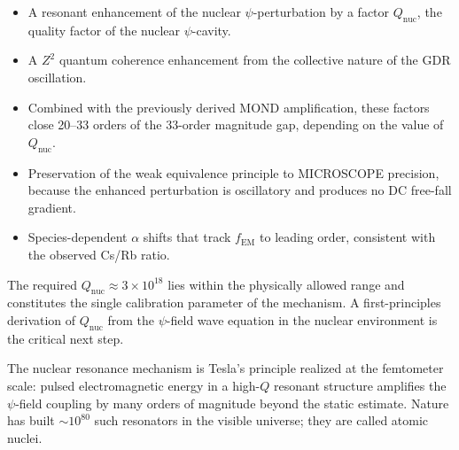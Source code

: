 \documentclass[aps,prd,twocolumn,superscriptaddress,nofootinbib]{revtex4-2}
\newcommand{\ee}[1]{\times 10^{#1}}
\newcommand{\fEM}{f_{\mathrm{EM}}}
\newcommand{\Qnuc}{Q_{\mathrm{nuc}}}
\begin{document}
\begin{itemize}[nosep]
\item A resonant enhancement of the nuclear $\psi$-perturbation by
a factor $\Qnuc$, the quality factor of the nuclear $\psi$-cavity.

\item A $Z^2$ quantum coherence enhancement from the collective
nature of the GDR oscillation.

\item Combined with the previously derived MOND amplification,
these factors close 20--33 orders of the 33-order magnitude gap,
depending on the value of $\Qnuc$.

\item Preservation of the weak equivalence principle to MICROSCOPE
precision, because the enhanced perturbation is oscillatory and
produces no DC free-fall gradient.

\item Species-dependent $\alpha$ shifts that track $\fEM$ to leading
order, consistent with the observed Cs/Rb ratio.
\end{itemize}

The required $\Qnuc \approx 3\ee{18}$ lies within the physically
allowed range and constitutes the single calibration parameter of
the mechanism.  A first-principles derivation of $\Qnuc$ from the
$\psi$-field wave equation in the nuclear environment is the
critical next step.

The nuclear resonance mechanism is Tesla's principle realized at the
femtometer scale: pulsed electromagnetic energy in a high-$Q$
resonant structure amplifies the $\psi$-field coupling by many
orders of magnitude beyond the static estimate.  Nature has built
$\sim\!10^{80}$ such resonators in the visible universe; they are
called atomic nuclei.


\end{document}
